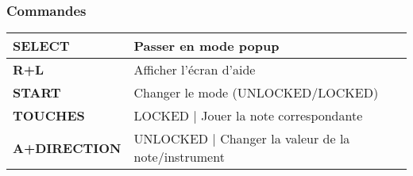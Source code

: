 \subsubsection{Commandes}

\tablelasttail{\hline}
\begin{supertabular}{|l|p{11cm}|}
\hline
    {\bf SELECT} & Passer en mode popup \\
    \hline
    {\bf R+L} & Afficher l'écran d'aide \\
    \hline
    {\bf START} & Changer le mode (UNLOCKED/LOCKED) \\
    \hline
    {\bf TOUCHES} & LOCKED | Jouer la note correspondante \\
    \hline
    {\bf A+DIRECTION} & UNLOCKED | Changer la valeur de la note/instrument \\
\hline
\end{supertabular}
